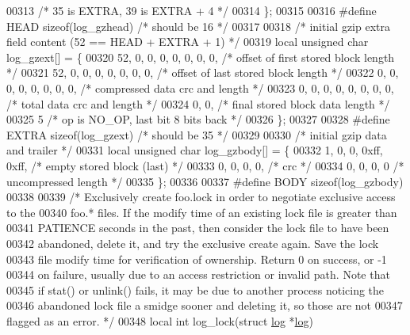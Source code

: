 \begin{DoxyCode}
00313                                 \textcolor{comment}{/* 35 is EXTRA, 39 is EXTRA + 4 */}
00314 \};
00315 
00316 \textcolor{preprocessor}{#define HEAD sizeof(log\_gzhead)     }\textcolor{comment}{/* should be 16 */}\textcolor{preprocessor}{}
00317 
00318 \textcolor{comment}{/* initial gzip extra field content (52 == HEAD + EXTRA + 1) */}
00319 local \textcolor{keywordtype}{unsigned} \textcolor{keywordtype}{char} log\_gzext[] = \{
00320     52, 0, 0, 0, 0, 0, 0, 0,    \textcolor{comment}{/* offset of first stored block length */}
00321     52, 0, 0, 0, 0, 0, 0, 0,    \textcolor{comment}{/* offset of last stored block length */}
00322     0, 0, 0, 0, 0, 0, 0, 0,     \textcolor{comment}{/* compressed data crc and length */}
00323     0, 0, 0, 0, 0, 0, 0, 0,     \textcolor{comment}{/* total data crc and length */}
00324     0, 0,                       \textcolor{comment}{/* final stored block data length */}
00325     5                           \textcolor{comment}{/* op is NO\_OP, last bit 8 bits back */}
00326 \};
00327 
00328 \textcolor{preprocessor}{#define EXTRA sizeof(log\_gzext)     }\textcolor{comment}{/* should be 35 */}\textcolor{preprocessor}{}
00329 
00330 \textcolor{comment}{/* initial gzip data and trailer */}
00331 local \textcolor{keywordtype}{unsigned} \textcolor{keywordtype}{char} log\_gzbody[] = \{
00332     1, 0, 0, 0xff, 0xff,        \textcolor{comment}{/* empty stored block (last) */}
00333     0, 0, 0, 0,                 \textcolor{comment}{/* crc */}
00334     0, 0, 0, 0                  \textcolor{comment}{/* uncompressed length */}
00335 \};
00336 
00337 \textcolor{preprocessor}{#define BODY sizeof(log\_gzbody)}
00338 
00339 \textcolor{comment}{/* Exclusively create foo.lock in order to negotiate exclusive access to the}
00340 \textcolor{comment}{   foo.* files.  If the modify time of an existing lock file is greater than}
00341 \textcolor{comment}{   PATIENCE seconds in the past, then consider the lock file to have been}
00342 \textcolor{comment}{   abandoned, delete it, and try the exclusive create again.  Save the lock}
00343 \textcolor{comment}{   file modify time for verification of ownership.  Return 0 on success, or -1}
00344 \textcolor{comment}{   on failure, usually due to an access restriction or invalid path.  Note that}
00345 \textcolor{comment}{   if stat() or unlink() fails, it may be due to another process noticing the}
00346 \textcolor{comment}{   abandoned lock file a smidge sooner and deleting it, so those are not}
00347 \textcolor{comment}{   flagged as an error. */}
00348 local \textcolor{keywordtype}{int} log\_lock(\textcolor{keyword}{struct} \hyperlink{structlog}{log} *\hyperlink{structlog}{log})

\end{DoxyCode}
